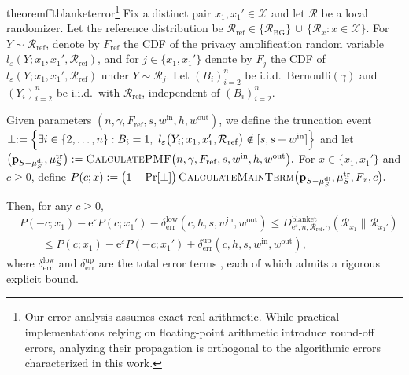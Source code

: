 \documentclass{article}
\theoremstyle{plain}
\theoremstyle{definition}
\begin{document}
\begin{restatable}{theorem}{fftblanketerror}\footnote{
Our error analysis assumes exact real arithmetic. 
While practical implementations relying on floating-point arithmetic introduce round-off errors, analyzing their propagation is orthogonal to the algorithmic errors characterized in this work.
}
\label{thm:fft-blanket-error}
Fix a distinct pair $x_1,x_1' \in \mathcal{X}$ and let $\mathcal R$ be a local randomizer.
Let the reference distribution be
$
  \mathcal R_{\mathrm{ref}}
  \in
  \bigl\{\mathcal R_{\mathrm{BG}}\bigr\}
  \,\cup\,
  \bigl\{\mathcal R_x : x\in\mathcal X\bigr\}.
$
For $Y\sim\mathcal R_{\mathrm{ref}}$, denote by $F_{\mathrm{ref}}$ the CDF of
the privacy amplification random variable
$l_\varepsilon(Y;x_1,x_1',\mathcal R_{\mathrm{ref}})$, and for
$j\in\{x_1,x_1'\}$ denote by $F_j$ the CDF of
$l_\varepsilon(Y;x_1,x_1',\mathcal R_{\mathrm{ref}})$ under $Y\sim\mathcal R_j$.
Let $(B_i)_{i=2}^n$ be i.i.d.\ $\mathrm{Bernoulli}(\gamma)$ and
$(Y_i)_{i=2}^n$ be i.i.d.\ with $\mathcal R_{\mathrm{ref}}$,
independent of $(B_i)_{i=2}^n$.

Given parameters $(n,\gamma,F_{\mathrm{ref}},s,w^{\mathrm{in}},h,w^{\mathrm{out}})$, we define the truncation event
$
  \perp
  :=
  \Bigl\{
    \exists i\in\{2,\dots,n\} :
    B_i = 1,\ 
    l_\varepsilon\bigl(Y_i;x_1,x_1',\mathcal R_{\mathrm{ref}}\bigr)
      \notin [s,s+w^{\mathrm{in}}]
  \Bigr\}
$ and let
$
  \bigl(\mathbf{p}_{S-\mu_S^{\mathrm{di}}},\mu_S^{\mathrm{tr}}\bigr)
  :=
  \textsc{CalculatePMF}
  \bigl(
    n,\gamma,F_{\mathrm{ref}},
    s,w^{\mathrm{in}},h,w^{\mathrm{out}}
  \bigr).
$
For $x\in\{x_1,x_1'\}$ and $c\ge0$, define
$
  P(c;x)
  :=
  \bigl(1-\Pr[\perp]\bigr)\,
  \textsc{CalculateMainTerm}
  \bigl(
    \mathbf{p}_{S-\mu_S^{\mathrm{di}}},\mu_S^{\mathrm{tr}},
    F_x,c
  \bigr).
$


Then, for any $c \ge 0$,
\begin{align*}
  &P(-c;x_1) - \mathrm e^\varepsilon P(c;x_1')
   - \delta_{\mathrm{err}}^{\mathrm{low}}(c,h,s,w^{\mathrm{in}},w^{\mathrm{out}})
   \leq
  D_{\mathrm e^\varepsilon,n,\mathcal R_{\mathrm{ref}},\gamma}^{\mathrm{blanket}}
    (\mathcal R_{x_1}\|\mathcal R_{x_1'})
  \\
  &\qquad\leq
  P(c;x_1) - \mathrm e^\varepsilon P(-c;x_1')
  + \delta_{\mathrm{err}}^{\mathrm{up}}(c,h,s,w^{\mathrm{in}},w^{\mathrm{out}}),
\end{align*}
where $\delta_{\mathrm{err}}^{\mathrm{low}}$ and
$\delta_{\mathrm{err}}^{\mathrm{up}}$ are the total error terms 
, each of which
admits a rigorous explicit bound.
\end{restatable}
\end{document}
